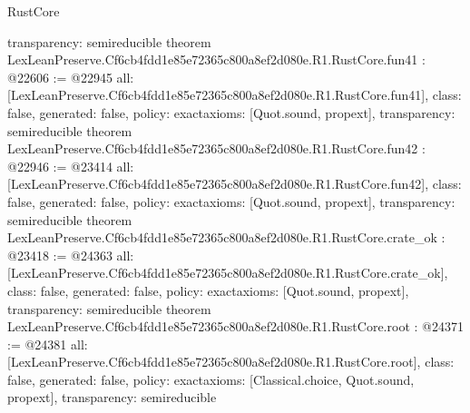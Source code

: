 \begin{lexlean}{RustCore}
\begin{coremodule}
{  transparency: semireducible
}
theorem LexLeanPreserve.Cf6cb4fdd1e85e72365c800a8ef2d080e.R1.RustCore.fun41 : @22606 := @22945 {
  all: [LexLeanPreserve.Cf6cb4fdd1e85e72365c800a8ef2d080e.R1.RustCore.fun41],
  class: false,
  generated: false,
  policy: exact{axioms: [Quot.sound, propext]},
  transparency: semireducible
}
theorem LexLeanPreserve.Cf6cb4fdd1e85e72365c800a8ef2d080e.R1.RustCore.fun42 : @22946 := @23414 {
  all: [LexLeanPreserve.Cf6cb4fdd1e85e72365c800a8ef2d080e.R1.RustCore.fun42],
  class: false,
  generated: false,
  policy: exact{axioms: [Quot.sound, propext]},
  transparency: semireducible
}
theorem LexLeanPreserve.Cf6cb4fdd1e85e72365c800a8ef2d080e.R1.RustCore.crate_ok : @23418 := @24363 {
  all: [LexLeanPreserve.Cf6cb4fdd1e85e72365c800a8ef2d080e.R1.RustCore.crate_ok],
  class: false,
  generated: false,
  policy: exact{axioms: [Quot.sound, propext]},
  transparency: semireducible
}
theorem LexLeanPreserve.Cf6cb4fdd1e85e72365c800a8ef2d080e.R1.RustCore.root : @24371 := @24381 {
  all: [LexLeanPreserve.Cf6cb4fdd1e85e72365c800a8ef2d080e.R1.RustCore.root],
  class: false,
  generated: false,
  policy: exact{axioms: [Classical.choice, Quot.sound, propext]},
  transparency: semireducible
}


\end{coremodule}
\end{lexlean}
